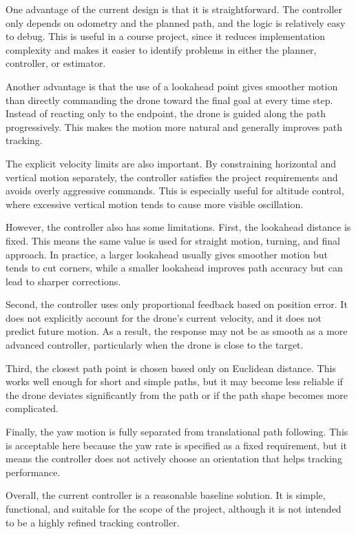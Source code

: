 \documentclass[12pt,twoside,letterpaper]{article}
\begin{document}
One advantage of the current design is that it is straightforward. The controller only depends on odometry and the planned path, and the logic is relatively easy to debug. This is useful in a course project, since it reduces implementation complexity and makes it easier to identify problems in either the planner, controller, or estimator.

Another advantage is that the use of a lookahead point gives smoother motion than directly commanding the drone toward the final goal at every time step. Instead of reacting only to the endpoint, the drone is guided along the path progressively. This makes the motion more natural and generally improves path tracking.

The explicit velocity limits are also important. By constraining horizontal and vertical motion separately, the controller satisfies the project requirements and avoids overly aggressive commands. This is especially useful for altitude control, where excessive vertical motion tends to cause more visible oscillation.

However, the controller also has some limitations. First, the lookahead distance is fixed. This means the same value is used for straight motion, turning, and final approach. In practice, a larger lookahead usually gives smoother motion but tends to cut corners, while a smaller lookahead improves path accuracy but can lead to sharper corrections.

Second, the controller uses only proportional feedback based on position error. It does not explicitly account for the drone's current velocity, and it does not predict future motion. As a result, the response may not be as smooth as a more advanced controller, particularly when the drone is close to the target.

Third, the closest path point is chosen based only on Euclidean distance. This works well enough for short and simple paths, but it may become less reliable if the drone deviates significantly from the path or if the path shape becomes more complicated.

Finally, the yaw motion is fully separated from translational path following. This is acceptable here because the yaw rate is specified as a fixed requirement, but it means the controller does not actively choose an orientation that helps tracking performance.

Overall, the current controller is a reasonable baseline solution. It is simple, functional, and suitable for the scope of the project, although it is not intended to be a highly refined tracking controller.
\end{document}
